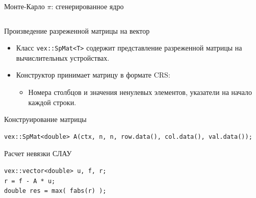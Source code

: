 \documentclass[@BEAMER_OPTIONS@]{beamer}
\newcommand{\code}[1]{\lstinline|#1|}
\begin{document}
\begin{frame}[fragile]{Монте-Карло $\pi$: сгенерированное ядро}
\begin{columns}
\begin{column}[t]{0.3\textwidth}
\begin{exampleblock}{}
                \begin{adjustbox}{width=0.23\textwidth, height=\textheight, keepaspectratio}
                    \begin{minipage}{\textwidth}
                        
                        \vspace{\baselineskip}
                    \end{minipage}
                \end{adjustbox}
            \end{exampleblock}
        \end{column}
    \end{columns}
\end{frame}

\begin{frame}[fragile]{Произведение разреженной матрицы на вектор}
    \begin{itemize}
        \item Класс \code{vex::SpMat<T>} содержит представление разреженной
            матрицы на вычислительных устройствах.
        \item Конструктор принимает матрицу в формате CRS:
            \begin{itemize}
                \item Номера столбцов и значения ненулевых элементов, указатели
                    на начало каждой строки.
            \end{itemize}
    \end{itemize}
    \begin{exampleblock}{Конструирование матрицы}
        \begin{lstlisting}
vex::SpMat<double> A(ctx, n, n, row.data(), col.data(), val.data());
        \end{lstlisting}
    \end{exampleblock}

    \begin{exampleblock}{Расчет невязки СЛАУ}
        \begin{lstlisting}[firstnumber=last]
vex::vector<double> u, f, r;
r = f - A * u;
double res = max( fabs(r) );
        \end{lstlisting}
    \end{exampleblock}
\end{frame}

\end{document}
